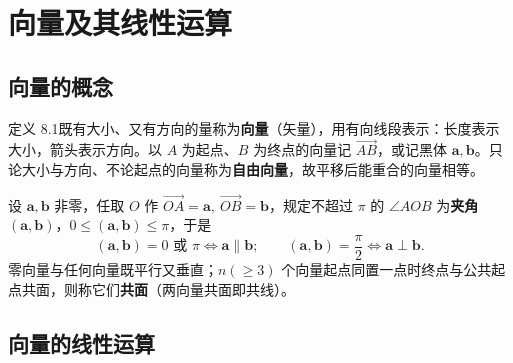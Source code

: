 
\section{向量及其线性运算}

\subsection{向量的概念}

定义 8.1\quad 既有大小、又有方向的量称为\textbf{向量}（矢量），用有向线段表示：长度表示大小，箭头表示方向。以 $A$ 为起点、$B$ 为终点的向量记 $\overrightarrow{AB}$，或记黑体 $\boldsymbol a,\boldsymbol b$。只论大小与方向、不论起点的向量称为\textbf{自由向量}，故平移后能重合的向量相等。


设 $\boldsymbol a,\boldsymbol b$ 非零，任取 $O$ 作 $\overrightarrow{OA}=\boldsymbol a,\ \overrightarrow{OB}=\boldsymbol b$，规定不超过 $\pi$ 的 $\angle AOB$ 为\textbf{夹角} $(\boldsymbol a,\boldsymbol b)$，$0\le(\boldsymbol a,\boldsymbol b)\le\pi$，于是
\begin{equation}
(\boldsymbol a,\boldsymbol b)=0\text{ 或 }\pi\iff\boldsymbol a\parallel\boldsymbol b;\qquad
(\boldsymbol a,\boldsymbol b)=\frac\pi2\iff\boldsymbol a\perp\boldsymbol b .
\end{equation}
零向量与任何向量既平行又垂直；$n(\ge3)$ 个向量起点同置一点时终点与公共起点共面，则称它们\textbf{共面}（两向量共面即共线）。

\subsection{向量的线性运算}

